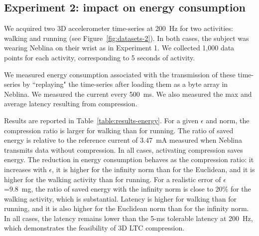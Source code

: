\documentclass{report}
\begin{document}

\subsection{Experiment 2: impact on energy consumption}

We acquired two 3D accelerometer time-series at 200~Hz for two 
activities: walking and running (see Figure~\ref{fig:datasets-2}). In 
both cases, the subject was wearing Neblina on their wrist as in 
Experiment 1. We collected 1,000 data points for each activity, 
corresponding to 5 seconds of activity.

We measured energy consumption associated with the transmission of 
these time-series by ``replaying" the time-series after loading them as 
a byte array in Neblina. We measured the current every 500~ms. We also 
measured the max and average latency resulting from compression.

 Results are reported in Table~\ref{table:results-energy}. For a given
 $\epsilon$ and norm, the compression ratio is larger for walking than
 for running. The ratio of saved energy is relative to the reference
 current of 3.47~mA measured when Neblina transmits data without
 compression. In all cases, activating compression saves energy. The 
 reduction in energy consumption behaves as the compression ratio: it 
 increases with $\epsilon$, it is higher for the infinity norm than for 
 the Euclidean, and it is higher for the walking activity than for 
 running. For a realistic error of $\epsilon$=9.8~mg, the ratio of 
 saved energy with the infinity norm is close to 20\% for the walking 
 activity, which is substantial. Latency is higher for walking 
 than for running, and it is also higher for the Euclidean norm than 
 for the infinity norm. In all cases, the latency remains lower 
 than the 5-ms tolerable latency at 200~Hz, which demonstrates the 
 feasibility of 3D LTC compression.
\end{document}
